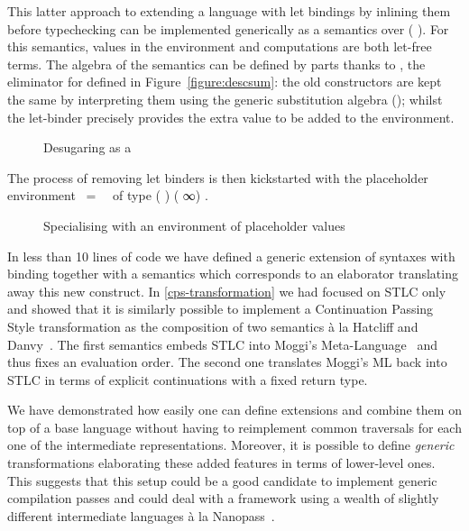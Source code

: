 This latter approach to extending a language  with let bindings
by inlining them before typechecking can be implemented generically as
a semantics over (  ). For this semantics, values
in the environment and computations are both let-free terms. The algebra
of the semantics can be defined by parts thanks to , the eliminator
for  defined in Figure~\ref{figure:descsum}:
the old constructors are kept the same by
interpreting them using the generic substitution algebra ();
whilst the let-binder precisely provides the extra value to be added to the
environment.

\begin{figure}[h]
\caption{Desugaring as a \label{defn:UnLet}}
\end{figure}

The process of removing let binders is then kickstarted with the placeholder
environment ~=~~
of type {( ) (  ∞) }.

\begin{figure}[h]
\caption{Specialising  with an environment of placeholder values\label{defn:unlet}}
\end{figure}

In less than 10 lines of code we have defined a generic extension of
syntaxes with binding together with a semantics which corresponds
to an elaborator translating away this new construct.
In \cref{cps-transformation} we had focused on STLC only
and showed that it is similarly possible to implement a Continuation
Passing Style transformation as the composition of two semantics
à la Hatcliff and Danvy~\citeyear{hatcliff1994generic}.
The first semantics embeds STLC into Moggi's
Meta-Language~\citeyear{DBLP:journals/iandc/Moggi91} and thus fixes
an evaluation order. The second one translates Moggi's ML back into
STLC in terms of explicit continuations with a fixed return type.

We have demonstrated how easily one can define extensions and combine
them on top of a base language without having to reimplement common
traversals for each one of the intermediate representations. Moreover,
it is possible to define \emph{generic} transformations elaborating
these added features in terms of lower-level ones. This suggests that
this setup could be a good candidate to implement generic compilation
passes and could deal with a framework using a wealth of slightly
different intermediate languages à la Nanopass~\cite{Keep:2013:NFC:2544174.2500618}.

